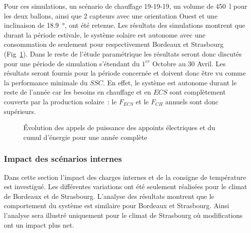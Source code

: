 Pour ces simulations, un scénario de chauffage 19-19-19, un volume de \SI{450}{\litre}
pour les deux ballons, ainsi que \num{2} capteurs avec une orientation Ouest et une
inclinaison de \SI{18.9}{\degree}, ont été retenue. Les résultats des simulations montrent
que durant la période estivale, le système solaire est autonome avec une consommation de
seulement  pour respectivement Bordeaux et
Strasbourg (Fig~\ref{fig:puissance_annuelle_defavorable}). Dans le reste de l’étude
paramétrique les résultats seront donc discutés pour une période de simulation s’étendant du
$1^{er}$ Octobre au $30$ Avril. Les résultats seront fournis pour la période
concernée et doivent donc être vu comme la performance minimale du $SSC$. En effet, le
système est autonome durant le reste de l’année car les besoins en chauffage et en $ECS$
sont complètement couverts par la production solaire~: le $F_{ECS}$ et le $F_{CH}$ annuels
sont donc supérieurs.

\begin{figure}
    \begin{center}
    \end{center}
    \caption{Évolution des appels de puissance des appoints électriques et du cumul d’énergie pour
             une année complète \label{fig:puissance_annuelle_defavorable}}
\end{figure}



\subsubsection{Impact des scénarios internes} %
\label{ssub:impact_des_scenarios_internes}
Dans cette section l’impact des charges internes et de la consigne de température est
investigué. Les différentes variations ont été seulement réalisées pour le climat
de Bordeaux et de Strasbourg. L’analyse des résultats montrent que le comportement
du système est similaire pour Bordeaux et Strasbourg. Ainsi l’analyse sera illustré
uniquement pour le climat de Strasbourg où modifications ont un impact plus net.

